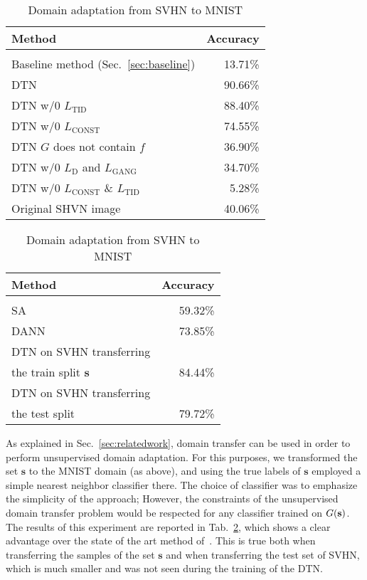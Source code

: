 \documentclass{article} \usepackage{iclr2017_conference,times}
\begin{document}
\begin{table}[t]
    \begin{minipage}{.5\linewidth}
      \caption{\label{tab:comparemnist} Accuracy of the MNIST classifier on the sampled transferred by our DTN method from SHVN to MNIST.}
      \centering
       \begin{tabular}{lr}
Method & Accuracy \\ \hline \\
Baseline method (Sec.~\ref{sec:baseline})         & 13.71\% \\
\hline
DTN     & {90.66}\%  \\
DTN w/0 $L_\text{TID}$  & 88.40\%  \\
DTN w/0 $L_\text{CONST}$  & 74.55\%  \\
DTN $G$ does not contain $f$  & 36.90\%  \\
DTN w/0 $L_\text{D}$ and $L_\text{GANG}$  & 34.70\% \\
DTN w/0 $L_\text{CONST}$ \& $L_\text{TID}$   &  5.28\%  \\
\hline
Original SHVN image & 40.06\% \\
\hline
\end{tabular}
    \end{minipage}
\hspace{.4cm}
\begin{minipage}{.40\linewidth}
      \centering
        \caption{\label{tab:domaintransfer}Domain adaptation from SVHN to MNIST}
       \begin{tabular}{lr}
Method & Accuracy \\ \hline \\
SA~\citet{fernando} & 59.32\%\\
DANN~\citet{domaingan} & 73.85\%\\
DTN on SVHN transferring\\
the train split $\mathbf s$ & 84.44\%\\
DTN on SVHN transferring\\
the test split & 79.72\%\\
\hline
\end{tabular}
\vspace{.44567847905in}
\end{minipage} 
\end{table}

As explained in Sec.~\ref{sec:relatedwork}, domain transfer can be used in order to perform unsupervised domain adaptation. For this purposes, we transformed the set $\mathbf s$ to the MNIST domain (as above), and using the true labels of $\mathbf s$ employed a simple nearest neighbor classifier there. The choice of classifier was to emphasize the simplicity of the approach; However, the constraints of the unsupervised domain transfer problem would be respected for any classifier trained on $G(\textbf s)$. The results of this experiment are reported in Tab.~\ref{tab:domaintransfer}, which shows a clear advantage over the state of the art method of~\cite{domaingan}. This is true both when transferring the samples of the set $\mathbf s$ and when transferring the test set of SVHN, which is much smaller and was not seen during the training of the DTN.
\end{document}
